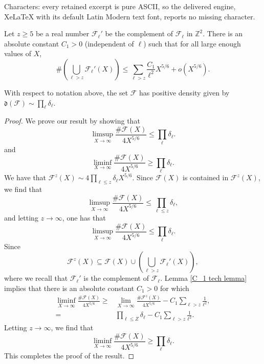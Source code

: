 \documentclass[10pt,a4paper]{amsart}
\newcommand{\Z}{\mathbb{Z}}
\newcommand{\cF}{\mathcal{F}}
\begin{document}
Characters: every retained excerpt is pure ASCII, so the delivered engine, XeLaTeX with its default Latin Modern text font, reports no missing character.
\begin{lemma}\label{C_1 tech lemma}
    Let $z\geq 5$ be a real number $\cF_\ell'$ be the complement of $\cF_\ell$ in $\Z^2$. There is an absolute constant $C_1>0$ (independent of $\ell$) such that for all large enough values of $X$,
    \[\# \left(\bigcup_{\ell> z}\cF_\ell'(X)\right)\leq \sum_{\ell>z}\frac{C_1}{\ell^2} X^{5/6}+o(X^{5/6}).\] 
\end{lemma}

\begin{proposition}\label{density of F is prod delta ell}
    With respect to notation above, the set $\cF$ has positive density given by $\mathfrak{d}(\cF)\sim \prod_{\ell} \delta_\ell$.
\end{proposition}

\begin{proof}
    We prove our result by showing that 
\begin{equation}\label{prop 4.15 eq 1}
    \limsup_{X\rightarrow \infty} \frac{\# \cF(X)}{4X^{5/6}}\leq \prod_{\ell} \delta_\ell.
    \end{equation}
    and 
    \begin{equation}\label{prop 4.15 eq 2}
    \liminf_{X\rightarrow \infty} \frac{\# \cF(X)}{4X^{5/6}}\geq \prod_{\ell} \delta_\ell.
    \end{equation}
We have that $\cF^z(X)\sim 4\prod_{\ell\leq z} \delta_\ell  X^{5/6}$. Since $\cF(X)$ is contained in $\cF^z(X)$, we find that 
     \[\limsup_{X\rightarrow \infty} \frac{\# \cF(X)}{4X^{5/6}}\leq \prod_{\ell\leq z} \delta_\ell,\]
     and letting $z\rightarrow \infty$, one has that
 \[\limsup_{X\rightarrow \infty} \frac{\# \cF(X)}{4X^{5/6}}\leq \prod_{\ell} \delta_\ell.\]
 Since \[\cF^z(X)\subseteq \cF(X)\cup \left(\bigcup_{\ell>z } \cF_\ell'(X)\right),\] where we recall that $\cF_\ell'$ is the complement of $\cF_\ell$. Lemma \ref{C_1 tech lemma} implies that there is an absolute constant $C_1>0$ for which
\[\begin{split}\liminf_{X\rightarrow \infty} \frac{\# \cF(X)}{4X^{5/6}}\geq & \lim_{X\rightarrow \infty} \frac{\# \cF^z(X)}{4X^{5/6}}-C_1 \sum_{\ell>z}\frac{1}{\ell^2},\\ = &\prod_{\ell \leq Z} \delta_\ell - C_1 \sum_{\ell>z}\frac{1}{\ell^2}. \end{split}\]
Letting $z\rightarrow \infty$, we find that 
\begin{equation}\label{liminf equation}\liminf_{X\rightarrow \infty} \frac{\# \cF(X)}{4 X^{5/6}}\geq \prod_{\ell} \delta_\ell.\end{equation}
This completes the proof of the result.
\end{proof}
\end{document}
